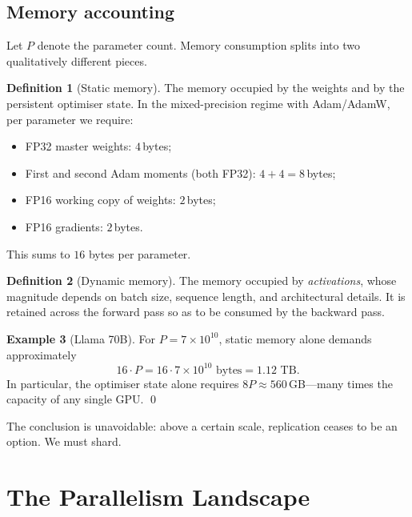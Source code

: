 \documentclass[11pt,a4paper]{article}
\theoremstyle{definition}
\newtheorem{definition}{Definition}[section]
\newtheorem{example}[definition]{Example}
\theoremstyle{remark}
\begin{document}
\subsection{Memory accounting}

Let $P$ denote the parameter count. Memory consumption splits into two qualitatively different pieces.

\begin{definition}[Static memory]
The memory occupied by the weights and by the persistent optimiser state. In the mixed-precision regime with Adam/AdamW, per parameter we require:
\begin{itemize}[leftmargin=2em, itemsep=0em]
    \item \textsc{FP32} master weights: $4$\,bytes;
    \item First and second Adam moments (both \textsc{FP32}): $4 + 4 = 8$\,bytes;
    \item \textsc{FP16} working copy of weights: $2$\,bytes;
    \item \textsc{FP16} gradients: $2$\,bytes.
\end{itemize}
This sums to $16$ bytes per parameter.
\end{definition}

\begin{definition}[Dynamic memory]
The memory occupied by \emph{activations}, whose magnitude depends on batch size, sequence length, and architectural details. It is retained across the forward pass so as to be consumed by the backward pass.
\end{definition}

\begin{example}[Llama 70B]
For $P = 7 \times 10^{10}$, static memory alone demands approximately
\[
    16 \cdot P = 16 \cdot 7 \times 10^{10} \text{ bytes} = 1.12 \text{ TB}.
\]
In particular, the optimiser state alone requires $8P \approx 560$\,GB---many times the capacity of any single GPU. \qed
\end{example}

The conclusion is unavoidable: above a certain scale, replication ceases to be an option. We must shard.

\section{The Parallelism Landscape}
\end{document}
